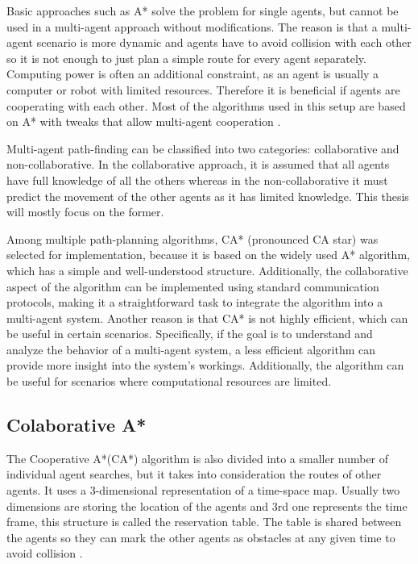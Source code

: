 Basic approaches such as A* solve the problem for single agents, but cannot be used in a multi-agent approach without modifications. The reason is that a multi-agent scenario is more dynamic and agents have to avoid collision with each other so it is not enough to just plan a simple route for every agent separately. Computing power is often an additional constraint, as an agent is usually a computer or robot with limited resources. Therefore it is beneficial if agents are cooperating with each other. Most of the algorithms used in this setup are based on A* with tweaks that allow multi-agent cooperation \cite{path_adv}.

Multi-agent path-finding can be classified into two categories: collaborative and non-collaborative. In the collaborative approach, it is assumed that all agents have full knowledge of all the others whereas in the non-collaborative it must predict the movement of the other agents as it has limited knowledge. This thesis will mostly focus on the former. 

Among multiple path-planning algorithms, CA* (pronounced CA star) was selected for implementation, because it is based on the widely used A* algorithm, which has a simple and well-understood structure. Additionally, the collaborative aspect of the algorithm can be implemented using standard communication protocols, making it a straightforward task to integrate the algorithm into a multi-agent system. Another reason is that CA* is not highly efficient, which can be useful in certain scenarios. Specifically, if the goal is to understand and analyze the behavior of a multi-agent system, a less efficient algorithm can provide more insight into the system's workings. Additionally, the algorithm can be useful for scenarios where computational resources are limited.

\subsection{Colaborative A*}
The Cooperative A*(CA*) algorithm is also divided into a smaller number of individual agent searches, but it takes into consideration the routes of other agents. It uses a 3-dimensional representation of a time-space map. Usually two dimensions are storing the location of the agents and 3rd one represents the time frame, this structure is called the reservation table. The table is shared between the agents so they can mark the other agents as obstacles at any given time to avoid collision \cite{path_adv}. 

